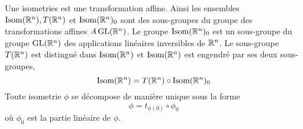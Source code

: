 \begin{theorem}
	Une isometries est une transformation affine. Ainsi les ensembles
	$\operatorname{Isom}(\mathbb{R}^n), T(\mathbb{R}^n)$ et $\operatorname{Isom}(\mathbb{R}^n)_0$ sont des sous-groupes du groupe des
	transformations affines $A\operatorname{GL}(\mathbb{R}^n)$. Le groupe $\operatorname{Isom}(\mathbb{R}^n)_0$ est un
	sous-groupe du groupe $\operatorname{GL}(\mathbb{R}^n)$ des applications linéaires inversibles de
	$\mathbb{R}^n$. Le sous-groupe $T(\mathbb{R}^n)$ est distingué dans $\operatorname{Isom}(\mathbb{R}^n)$ et
	$\operatorname{Isom}(\mathbb{R}^n)$ est engendré par ses deux sous-groupes,
	\begin{equation*}
		\operatorname{Isom}(\mathbb{R}^n) = T(\mathbb{R}^n) \circ \operatorname{Isom}(\mathbb{R}^n)_0
	\end{equation*}
	Toute isometrie $\phi$ se décompose de manière unique sous la forme
	\begin{equation*}
		\phi = t_{\phi(0)} \circ \phi_0
	\end{equation*}
	où $\phi_0$ est la partie linéaire de $\phi$.
\end{theorem}
